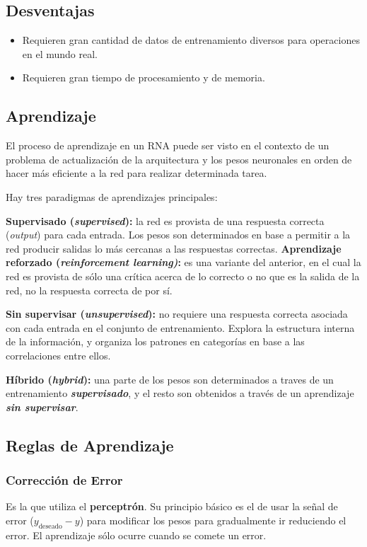 \documentclass[10pt,a4paper]{article}
\begin{document}
\subsection{Desventajas}

\begin{itemize}
\item Requieren gran cantidad de datos de entrenamiento diversos para operaciones en el mundo real.
\item Requieren gran tiempo de procesamiento y de memoria.
\end{itemize}

\subsection{Aprendizaje}
El proceso de aprendizaje en un RNA puede ser visto en el contexto de un problema de actualización de la arquitectura y los pesos neuronales en orden de hacer más eficiente a la red para realizar determinada tarea.

Hay tres paradigmas de aprendizajes principales:
\begin{description}
\item \textbf{Supervisado (\textit{supervised}):} la red es provista de una respuesta correcta (\textit{output}) para cada entrada. Los pesos son determinados en base a permitir a la red producir salidas lo más cercanas a las respuestas correctas.
\subitem \textbf{Aprendizaje reforzado (\textit{reinforcement learning)}:} es una variante del anterior, en el cual la red es provista de sólo una crítica acerca de lo correcto o no que es la salida de la red, no la respuesta correcta de por sí.
\item \textbf{Sin supervisar (\textit{unsupervised}):} no requiere una respuesta correcta asociada con cada entrada en el conjunto de entrenamiento. Explora la estructura interna de la información, y organiza los patrones en categorías en base a las correlaciones entre ellos.
\item \textbf{Híbrido (\textit{hybrid}):} una parte de los pesos son determinados a traves de un entrenamiento \textbf{\textit{supervisado}}, y el resto son obtenidos a través de un aprendizaje \textbf{\textit{sin supervisar}}.
\end{description}

\subsection{Reglas de Aprendizaje}
\subsubsection{Corrección de Error}
Es la que utiliza el \textbf{perceptrón}. Su principio básico es el de usar la señal de error ($y_{\text{deseado}}-y$) para modificar los pesos para gradualmente ir reduciendo el error. El aprendizaje sólo ocurre cuando se comete un error.
\end{document}

